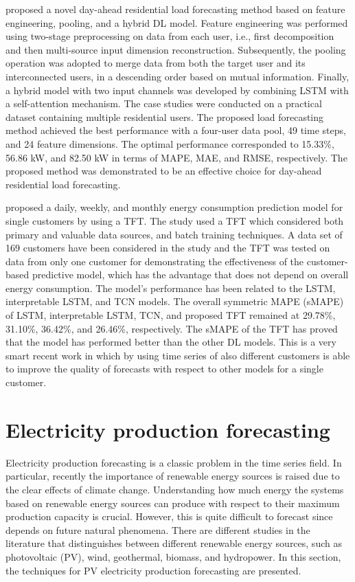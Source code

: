 \cite{ZANG2021120682} proposed a novel day-ahead residential load forecasting method based on feature engineering, pooling, and a hybrid DL model.
Feature engineering was performed using two-stage preprocessing on data from each user, i.e., first decomposition and then multi-source input dimension reconstruction.
Subsequently, the pooling operation was adopted to merge data from both the target user and its interconnected users, in a descending order based on mutual information.
Finally, a hybrid model with two input channels was developed by combining LSTM with a self-attention mechanism.
The case studies were conducted on a practical dataset containing multiple residential users.
The proposed load forecasting method achieved the best performance with a four-user data pool, 49 time steps, and 24 feature dimensions.
The optimal performance corresponded to 15.33\%, 56.86 kW, and 82.50 kW in terms of MAPE, MAE, and RMSE, respectively.
The proposed method was demonstrated to be an effective choice for day-ahead residential load forecasting.

\cite{NAZIR2023100888} proposed a daily, weekly, and monthly energy consumption prediction model for single customers by using a TFT.
The study used a TFT which considered both primary and valuable data sources, and batch training techniques.
A data set of 169 customers have been considered in the study and the TFT was tested on data from only one customer for demonstrating the effectiveness of the customer-based predictive model, which has the advantage that does not depend on overall energy consumption.
The model’s performance has been related to the LSTM, interpretable LSTM, and TCN models.
The overall symmetric MAPE (sMAPE) of LSTM, interpretable LSTM, TCN, and proposed TFT remained at 29.78\%, 31.10\%, 36.42\%, and 26.46\%, respectively.
The sMAPE of the TFT has proved that the model has performed better than the other DL models.
This is a very smart recent work in which by using time series of also different customers is able to improve the quality of forecasts with respect to other models for a single customer.


\section{Electricity production forecasting}
\label{sec:productionsoa}
\vspace{0.2 cm}

Electricity production forecasting is a classic problem in the time series field.
In particular, recently the importance of renewable energy sources is raised due to the clear effects of climate change.
Understanding how much energy the systems based on renewable energy sources can produce with respect to their maximum production capacity is crucial.
However, this is quite difficult to forecast since depends on future natural phenomena.
There are different studies in the literature that distinguishes between different renewable energy sources, such as photovoltaic (PV), wind, geothermal, biomass, and hydropower.
In this section, the techniques for PV electricity production forecasting are presented.

